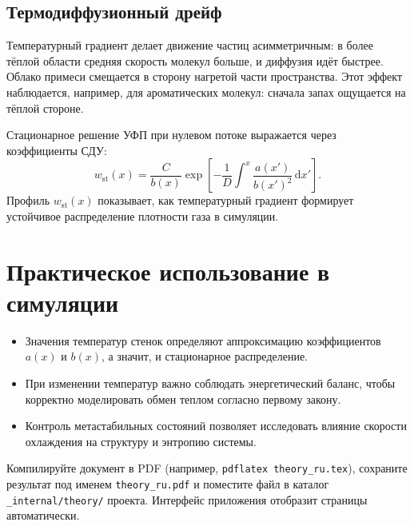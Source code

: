 \documentclass[12pt,a4paper]{article}
\begin{document}
\subsection{Термодиффузионный дрейф}
Температурный градиент делает движение частиц асимметричным: в более тёплой области средняя скорость молекул больше, и диффузия идёт быстрее. Облако примеси смещается в сторону нагретой части пространства. Этот эффект наблюдается, например, для ароматических молекул: сначала запах ощущается на тёплой стороне.

Стационарное решение УФП при нулевом потоке выражается через коэффициенты СДУ:
\begin{equation}
    w_{\mathrm{st}}(x) = \frac{C}{b(x)} \exp\!\left[ -\frac{1}{D} \int^x \frac{a(x')}{b(x')^2}\, \mathrm{d}x' \right].
\end{equation}
Профиль $w_{\mathrm{st}}(x)$ показывает, как температурный градиент формирует устойчивое распределение плотности газа в симуляции.

\section{Практическое использование в симуляции}
\begin{itemize}
    \item Значения температур стенок определяют аппроксимацию коэффициентов $a(x)$ и $b(x)$, а значит, и стационарное распределение.
    \item При изменении температур важно соблюдать энергетический баланс, чтобы корректно моделировать обмен теплом согласно первому закону.
    \item Контроль метастабильных состояний позволяет исследовать влияние скорости охлаждения на структуру и энтропию системы.
\end{itemize}

\vspace{1em}
\noindent%
Компилируйте документ в PDF (например, \texttt{pdflatex theory\_ru.tex}), сохраните результат под именем \texttt{theory\_ru.pdf} и поместите файл в каталог \texttt{\_internal/theory/} проекта. Интерфейс приложения отобразит страницы автоматически.
\end{document}
